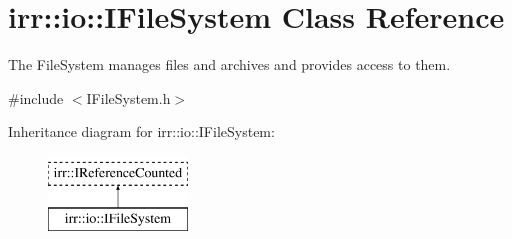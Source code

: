 \hypertarget{classirr_1_1io_1_1IFileSystem}{}\section{irr\+:\+:io\+:\+:I\+File\+System Class Reference}
\label{classirr_1_1io_1_1IFileSystem}


The File\+System manages files and archives and provides access to them.  




{\ttfamily \#include $<$I\+File\+System.\+h$>$}

Inheritance diagram for irr\+:\+:io\+:\+:I\+File\+System\+:\begin{figure}[H]
\begin{center}
\leavevmode
\includegraphics[height=2.000000cm]{classirr_1_1io_1_1IFileSystem}
\end{center}
\end{figure}
